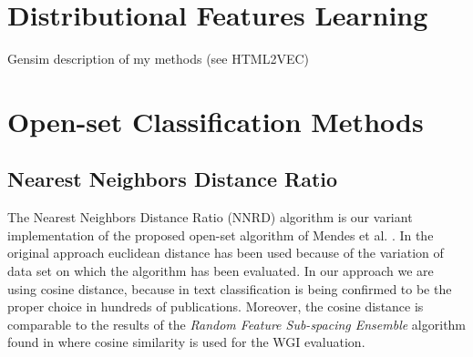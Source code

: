 \documentclass[runningheads]{llncs}
\begin{document}
%

\section{Distributional Features Learning}\label{sec:Gensim}

Gensim description of my methods (see HTML2VEC)

\section{Open-set Classification Methods}\label{sec:Open-set_methods}

\subsection{Nearest Neighbors Distance Ratio}\label{sec:NNRD_Description}

The Nearest Neighbors Distance Ratio (NNRD) algorithm is our variant implementation of the proposed open-set algorithm of Mendes et al. \cite{mendesjunior2016}. In the original approach euclidean distance has been used because of the variation of data set on which the algorithm has been evaluated. In our approach we are using cosine distance, because in text classification is being confirmed to be the proper choice in hundreds of publications. Moreover, the cosine distance is comparable to the results of the \textit{Random Feature Sub-spacing Ensemble} algorithm found in \cite{pritsos2018open} where cosine similarity is used for the WGI evaluation.
\end{document}
